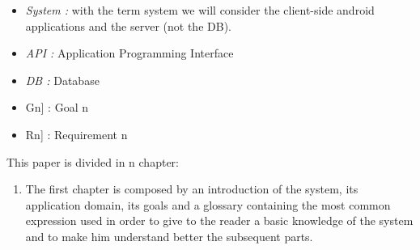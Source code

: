 \vspace*{-5mm}





\begin{itemize}
	\item \emph{System :} with the term system we will consider the client-side android applications and the server (not the DB).
\end{itemize}

\begin{itemize}
	\setlength{\leftskip}{0.5cm}
	\item \emph{API :} Application Programming Interface
	\item \emph{DB :} Database
\end{itemize}

\begin{itemize}
	\setlength{\leftskip}{0.5cm}
	\item \lbrack Gn] : Goal n
	\item \lbrack Rn] : Requirement n
\end{itemize}

This paper is divided in n chapter:
\begin{enumerate}
	\setlength{\leftskip}{0.5cm}
	\item The first chapter is composed by an introduction of the system, its application domain, its goals and a glossary containing the most common expression used in order to give to the reader a basic knowledge of the system and to make him understand better the subsequent parts.
	
	
\end{enumerate}
